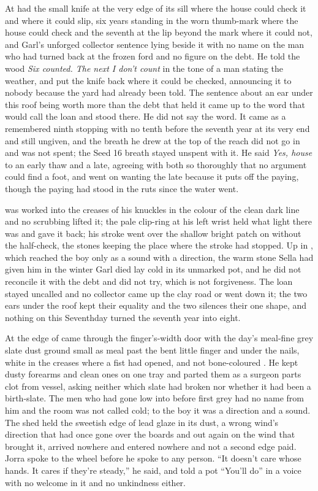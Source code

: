 At   had the small knife at the very edge of its sill where the house could check it and where it could slip, six years standing in the worn thumb-mark where the house could check and the seventh at the lip beyond the mark where it could not, and Garl's unforged collector sentence lying beside it with no name on the man who had turned back at the frozen ford and no figure on the debt. He told the wood \emph{Six counted. The next I don't count} in the tone of a man stating the weather, and put the knife back where it could be checked, announcing it to nobody because the yard had already been told. The sentence about an ear under this roof being worth more than the debt that held it came up to the word that would call the loan and stood there. He did not say the word. It came as a remembered ninth stopping with no tenth before the seventh year at its very end and still ungiven, and the breath he drew at the top of the reach did not go in and was not spent; the Seed 16 breath stayed unspent with it. He said \emph{Yes, house} to an early thaw and a late, agreeing with both so thoroughly that no argument could find a foot, and went on wanting the late because it puts off the paying, though the paying had stood in the ruts since the water went.

 was worked into the creases of his knuckles in the colour of the clean dark line and no scrubbing lifted it; the pale clip-ring at his left wrist held what light there was and gave it back; his stroke went over the shallow bright patch on  without the half-check, the stones keeping the place where the stroke had stopped. Up in , which reached the boy only as a sound with a direction, the warm stone Sella had given him in the winter Garl died lay cold in its unmarked pot, and he did not reconcile it with the debt and did not try, which is not forgiveness. The loan stayed uncalled and no collector came up the clay road or went down it; the two ears under the roof kept their equality and the two silences their one shape, and nothing on this Seventhday turned the seventh year into eight.

At the edge of   came through the finger's-width door with the day's meal-fine grey slate dust ground small as meal past the bent little finger and under the nails, white in the creases where a fist had opened, and not bone-coloured . He kept dusty forearms and clean ones on one tray and parted them as a surgeon parts clot from vessel, asking neither which slate had broken nor whether it had been a birth-slate. The men who had gone low into  before first grey had no name from him and the room was not called cold; to the boy it was a direction and a sound. The shed held the sweetish edge of lead glaze in its dust, a wrong wind's direction that had once gone over the boards and out again on the wind that brought it, arrived nowhere and entered nowhere and not a second edge paid. Jorra spoke to the wheel before he spoke to any person. “It doesn't care whose hands. It cares if they're steady,” he said, and told a pot “You'll do” in a voice with no welcome in it and no unkindness either.

